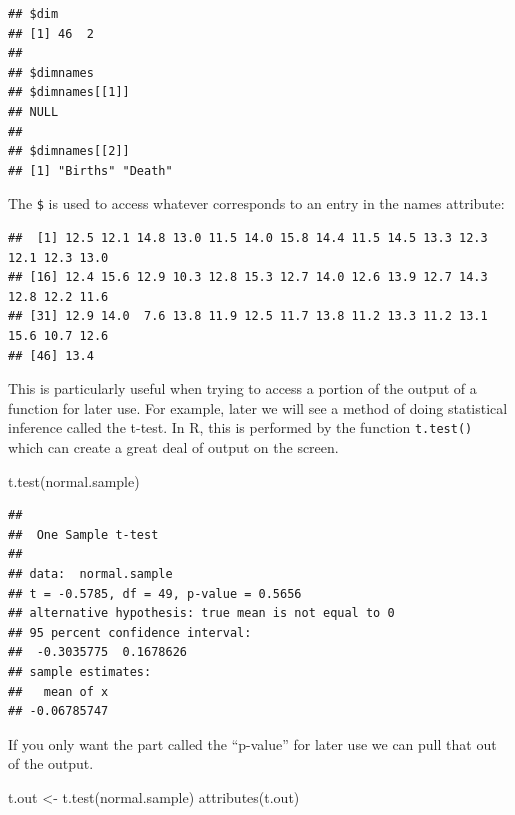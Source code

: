 \documentclass[
]{book}
\newenvironment{Shaded}{\begin{snugshade}}{\end{snugshade}}
\newcommand{\FunctionTok}[1]{\textcolor[rgb]{0.00,0.00,0.00}{#1}}
\newcommand{\NormalTok}[1]{#1}
\newcommand{\OtherTok}[1]{\textcolor[rgb]{0.56,0.35,0.01}{#1}}
\newcommand{\SpecialCharTok}[1]{\textcolor[rgb]{0.00,0.00,0.00}{#1}}
\begin{document}
\begin{verbatim}
## $dim
## [1] 46  2
## 
## $dimnames
## $dimnames[[1]]
## NULL
## 
## $dimnames[[2]]
## [1] "Births" "Death"
\end{verbatim}

The \texttt{\$} is used to access whatever corresponds to an entry in the names attribute:

\begin{Shaded}
\end{Shaded}

\begin{verbatim}
##  [1] 12.5 12.1 14.8 13.0 11.5 14.0 15.8 14.4 11.5 14.5 13.3 12.3 12.1 12.3 13.0
## [16] 12.4 15.6 12.9 10.3 12.8 15.3 12.7 14.0 12.6 13.9 12.7 14.3 12.8 12.2 11.6
## [31] 12.9 14.0  7.6 13.8 11.9 12.5 11.7 13.8 11.2 13.3 11.2 13.1 15.6 10.7 12.6
## [46] 13.4
\end{verbatim}

This is particularly useful when trying to access a portion of the output of a function for later use. For example, later we will see a method of doing statistical inference called the t-test. In R, this is performed by the function \texttt{t.test()} which can create a great deal of output on the screen.

\begin{Shaded}
\begin{Highlighting}[]
\FunctionTok{t.test}\NormalTok{(normal.sample)}
\end{Highlighting}
\end{Shaded}

\begin{verbatim}
## 
##  One Sample t-test
## 
## data:  normal.sample
## t = -0.5785, df = 49, p-value = 0.5656
## alternative hypothesis: true mean is not equal to 0
## 95 percent confidence interval:
##  -0.3035775  0.1678626
## sample estimates:
##   mean of x 
## -0.06785747
\end{verbatim}

If you only want the part called the ``p-value'' for later use we can pull that out of the output.

\begin{Shaded}
\begin{Highlighting}[]
\NormalTok{t.out }\OtherTok{\textless{}{-}} \FunctionTok{t.test}\NormalTok{(normal.sample)}
\FunctionTok{attributes}\NormalTok{(t.out)}
\end{Highlighting}
\end{Shaded}
\end{document}
